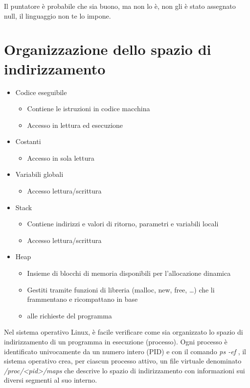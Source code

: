 Il puntatore è probabile che sia buono, ma non lo è, non gli è stato assegnato null, il linguaggio non te lo impone.

\section{Organizzazione dello spazio di indirizzamento  }

\begin{itemize}
  \item Codice eseguibile
        \begin{itemize}
          \item Contiene le istruzioni in codice macchina
          \item Accesso in lettura ed esecuzione
        \end{itemize}
  \item Costanti
        \begin{itemize}
          \item Accesso in sola lettura
        \end{itemize}
  \item Variabili globali
        \begin{itemize}
          \item Accesso lettura/scrittura
        \end{itemize}
  \item Stack
        \begin{itemize}
          \item Contiene indirizzi e valori di ritorno, parametri e variabili locali
          \item Accesso lettura/scrittura
        \end{itemize}
  \item Heap
        \begin{itemize}
          \item Insieme di blocchi di memoria disponibili per l'allocazione dinamica
          \item Gestiti tramite funzioni di libreria (malloc, new, free, …) che li frammentano e ricompattano in base
          \item alle richieste del programma
        \end{itemize}
\end{itemize}

Nel sistema operativo Linux, è facile verificare come sia organizzato lo spazio di indirizzamento di un programma in esecuzione (processo). Ogni processo è identificato univocamente da un numero intero (PID) e con il comando \textit{ps -ef} , il sistema operativo crea, per ciascun processo attivo, un file virtuale denominato \textit{/proc/<pid>/maps} che descrive lo spazio di indirizzamento con informazioni sui diversi segmenti al suo interno.


